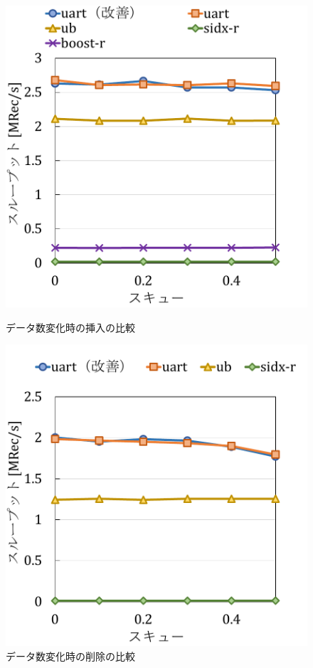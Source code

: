 \begin{figure}[tb]
  \begin{minipage}[c]{0.495\textwidth}
    \centering
    \includegraphics[scale=0.5]{./figures/graph-skew-insert-2.pdf}
    \caption{データ数変化時の挿入の比較}
    \label{graph:grouped}
  \end{minipage}
  \begin{minipage}[c]{0.495\textwidth}
    \centering
    \includegraphics[scale=0.5]{./figures/graph-skew-insert-8.pdf}
    \caption{データ数変化時の削除の比較}
    \label{graph:paired}
  \end{minipage}
\end{figure}

